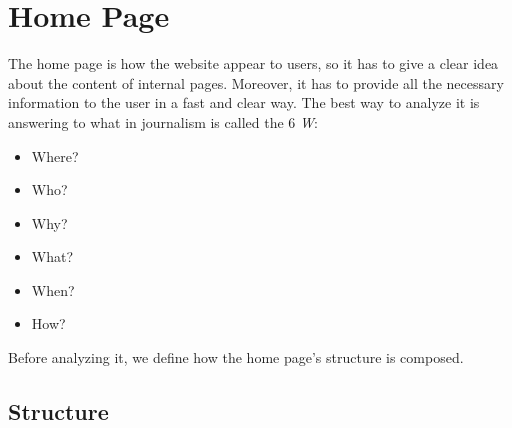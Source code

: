 \section{Home Page}
The home page is how the website appear to users, so it has to give a clear
idea about the content of internal pages. Moreover, it has to provide all
the necessary information to the user in a fast and clear way.
The best way to analyze it is answering to what in journalism is called
the 6 \textit{W}:
\begin{itemize}
    \item Where?
    \item Who?
    \item Why?
    \item What?
    \item When?
    \item How?
\end{itemize}

Before analyzing it, we define how the home page's structure is composed.
\subsection{Structure}
